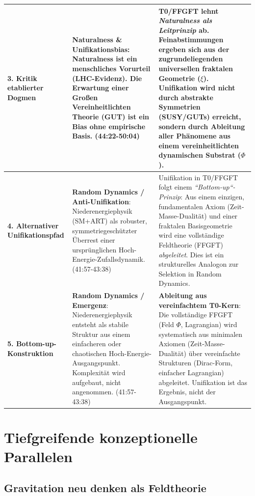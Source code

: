 \begin{longtable}{p{} p{} p{}}
		\textbf{3. Kritik etablierter Dogmen} & 
		\textbf{Naturalness \& Unifikationsbias}: Naturalness ist ein menschliches Vorurteil (LHC-Evidenz). Die Erwartung einer Großen Vereinheitlichten Theorie (GUT) ist ein Bias ohne empirische Basis. \cite{DonoghueInterview2025} (44:22-50:04) & 
		T0/FFGFT lehnt \emph{Naturalness als Leitprinzip} ab. Feinabstimmungen ergeben sich aus der zugrundeliegenden universellen fraktalen Geometrie ($\xi$). Unifikation wird nicht durch abstrakte Symmetrien (SUSY/GUTs) erreicht, sondern durch Ableitung aller Phänomene aus einem vereinheitlichten dynamischen Substrat ($\Phi$). \\
		\midrule
		
		\textbf{4. Alternativer Unifikationspfad} & 
		\textbf{Random Dynamics / Anti-Unifikation}: Niederenergiephysik (SM+ART) als robuster, symmetriegeschützter Überrest einer ursprünglichen Hoch-Energie-Zufallsdynamik. \cite{DonoghueInterview2025} (41:57-43:38) & 
		Unifikation in T0/FFGFT folgt einem \emph{``Bottom-up``-Prinzip}: Aus einem einzigen, fundamentalen Axiom (Zeit-Masse-Dualität) und einer fraktalen Basisgeometrie wird eine vollständige Feldtheorie (FFGFT) \emph{abgeleitet}. Dies ist ein strukturelles Analogon zur Selektion in Random Dynamics. \\
		\midrule
		
		\textbf{5. Bottom-up-Konstruktion} & 
		\textbf{Random Dynamics / Emergenz}: Niederenergiephysik entsteht als stabile Struktur aus einem einfacheren oder chaotischen Hoch-Energie-Ausgangspunkt. Komplexität wird aufgebaut, nicht angenommen. \cite{DonoghueInterview2025} (41:57-43:38) & 
		\textbf{Ableitung aus vereinfachtem T0-Kern}: Die vollständige FFGFT (Feld $\Phi$, Lagrangian) wird systematisch aus minimalen Axiomen (Zeit-Masse-Dualität) über vereinfachte Strukturen (Dirac-Form, einfacher Lagrangian) abgeleitet. Unifikation ist das Ergebnis, nicht der Ausgangspunkt. \\
		
	\end{longtable}
	
	\section{Tiefgreifende konzeptionelle Parallelen}
	
	\subsection{Gravitation neu denken als Feldtheorie}
	
